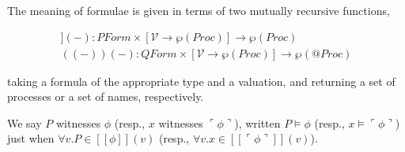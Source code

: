 \documentclass[submission,copyright,creativecommons]{eptcs}
\makeatletter
\newcommand{\ldb}{[\![}
\newcommand{\rdb}{]\!]}
\newcommand{\ldrb}{(\!(}
\newcommand{\rdrb}{)\!)}
\newcommand{\lpquote}{\ulcorner}
\newcommand{\rpquote}{\urcorner}
\newcommand{\id}[1]{\texttt{#1}}
\newcommand{\pzero}{\mathbin{0}}
\newcommand{\juxtap}{\mathbin{\id{|}}}
\newcommand{\concat}{\Rightarrow}
\newcommand{\scong}{\mathbin{\equiv}}
\newcommand{\nameeq}{\mathbin{\equiv_N}}
\newcommand{\binpar}[2]{#1 \juxtap #2}
\newcommand{\prefix}[3]{#1 ? ( #2 ) \concat #3}
\newcommand{\lift}[2]{#1 ! ( #2 )}
\newcommand{\quotep}[1]{@#1}
\newcommand{\dropn}[1]{*#1}
\newcommand{\substn}[2]{\id{\{} #1 / #2 \id{\}}}
\newcommand{\meaningof}[1]{\ldb #1 \rdb}
\newcommand{\pmeaningof}[1]{\ldb #1 \rdb}
\newcommand{\nmeaningof}[1]{\ldrb #1 \rdrb}
\newcommand{\Proc}{\mathbin{Proc}}
\newcommand{\QProc}{\quotep{\mathbin{Proc}}}
\newcommand{\defneqls}{\coloneqq}
\newcommand{\ptrue}{\mathbin{true}}
\newcommand{\pdropf}[1]{\rpquote #1 \lpquote}
\newcommand{\pquotep}[1]{\lpquote #1 \rpquote}
\newcommand{\plift}[2]{#1 ! ( #2 )}
\newcommand{\pprefix}[3]{\langle #1 ? #2 \rangle #3}
\newcommand{\pgfp}[2]{\textsf{rec} \; #1 \mathbin{.} #2}
\newcommand{\pquant}[3]{\forall #1 \mathbin{:} #2 \mathbin{.} #3}
\newcommand{\PFormula}{\mathbin{PForm}}
\newcommand{\QFormula}{\mathbin{QForm}}
\newcommand{\PropVar}{\mathbin{\mathcal{V}}}
\numberwithin{equation}{subsection}
\makeatother
\begin{document}
The meaning of formulae is given in terms of two mutually recursive functions,

\begin{eqnarray}
\pmeaningof{ - }( - ) : \PFormula \times [\PropVar \to \wp(\Proc)] \to \wp(\Proc) \nonumber\\
\nmeaningof{ - }( - ) : \QFormula \times [\PropVar \to \wp(\Proc)] \to \wp(\QProc) \nonumber
\end{eqnarray}

\noindent taking a formula of the appropriate type and a valuation, and
returning a set of processes or a set of names, respectively.


We say $P$ witnesses $\phi$ (resp., $x$ witnesses $\pquotep{\phi}$),
written $P \models \phi$ (resp., $x \models \pquotep{\phi}$) just when
$\forall v . P \in \meaningof{\phi}(v)$ (resp., $\forall v . x \in \meaningof{\pquotep{\phi}}(v)$).
\end{document}
